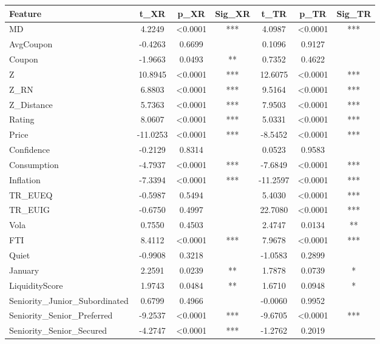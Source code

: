 \begin{center}
\begin{minipage}{\textwidth}
    \centering
    \small
    \begin{tabular}{lcccccc}
    \toprule
    \textbf{Feature} & \textbf{t\_XR} & \textbf{p\_XR} & \textbf{Sig\_XR} & \textbf{t\_TR} & \textbf{p\_TR} & \textbf{Sig\_TR} \\
    \midrule
    MD & 4.2249 & <0.0001 & *** & 4.0987 & <0.0001 & *** \\
    AvgCoupon & -0.4263 & 0.6699 &  & 0.1096 & 0.9127 &  \\
    Coupon & -1.9663 & 0.0493 & ** & 0.7352 & 0.4622 &  \\
    Z & 10.8945 & <0.0001 & *** & 12.6075 & <0.0001 & *** \\
    Z\_RN & 6.8803 & <0.0001 & *** & 9.5164 & <0.0001 & *** \\
    Z\_Distance & 5.7363 & <0.0001 & *** & 7.9503 & <0.0001 & *** \\
    Rating & 8.0607 & <0.0001 & *** & 5.0331 & <0.0001 & *** \\
    Price & -11.0253 & <0.0001 & *** & -8.5452 & <0.0001 & *** \\
    Confidence & -0.2129 & 0.8314 &  & 0.0523 & 0.9583 &  \\
    Consumption & -4.7937 & <0.0001 & *** & -7.6849 & <0.0001 & *** \\
    Inflation & -7.3394 & <0.0001 & *** & -11.2597 & <0.0001 & *** \\
    TR\_EUEQ & -0.5987 & 0.5494 &  & 5.4030 & <0.0001 & *** \\
    TR\_EUIG & -0.6750 & 0.4997 &  & 22.7080 & <0.0001 & *** \\
    Vola & 0.7550 & 0.4503 &  & 2.4747 & 0.0134 & ** \\
    FTI & 8.4112 & <0.0001 & *** & 7.9678 & <0.0001 & *** \\
    Quiet & -0.9908 & 0.3218 &  & -1.0583 & 0.2899 &  \\
    January & 2.2591 & 0.0239 & ** & 1.7878 & 0.0739 & * \\
    LiquidityScore & 1.9743 & 0.0484 & ** & 1.6710 & 0.0948 & * \\
    Seniority\_Junior\_Subordinated & 0.6799 & 0.4966 &  & -0.0060 & 0.9952 &  \\
    Seniority\_Senior\_Preferred & -9.2537 & <0.0001 & *** & -9.6705 & <0.0001 & *** \\
    Seniority\_Senior\_Secured & -4.2747 & <0.0001 & *** & -1.2762 & 0.2019 &  \\

\end{tabular}
\end{minipage}
\end{center}
